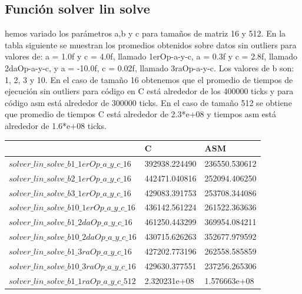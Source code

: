 \subsection{Función solver lin solve}
hemos variado los parámetros a,b y c para tamaños de matriz 16 y 512. En la tabla siguiente se muestran los promedios obtenidos sobre datos sin outliers para valores de: a = 1.0f y c = 4.0f, llamado 1erOp-a-y-c, a = 0.3f y c = 2.8f, llamado 2daOp-a-y-c, y a = -10.0f, c = 0.02f, llamado 3raOp-a-y-c. Los valores de b son: 1, 2, 3 y 10. En el caso de tamaño 16 obtenemos que el promedio de tiempos de ejecución sin outliers para código en C está alrededor de los 400000 ticks y para código asm está alrededor de 300000 ticks. En el caso de tamaño 512 se obtiene que promedio de tiempos C está alrededor de 2.3*e+08 y tiempos asm está alrededor de 1.6*e+08 ticks.
\begin{table}[htbp]
\begin{center}
\begin{tabular}{|l|l|l|}
\hline
  & C & ASM\\
\hline \hline
$solver\_lin\_solve\_b1\_1erOp\_a\_y\_c\_16$ & 392938.224490 & 236550.530612\\ \hline

$solver\_lin\_solve\_b2\_1erOp\_a\_y\_c\_16$ & 442471.040816 & 252094.406250\\ \hline

$solver\_lin\_solve\_b3\_1erOp\_a\_y\_c\_16$ & 429083.391753 & 253708.344086\\ \hline

$solver\_lin\_solve\_b10\_1erOp\_a\_y\_c\_16$ & 436142.561224  & 261522.363636\\ \hline


$solver\_lin\_solve\_b1\_2daOp\_a\_y\_c\_16$ & 461250.443299 & 369954.084211\\ \hline

$solver\_lin\_solve\_b10\_2daOp\_a\_y\_c\_16$ & 430715.626263 & 352677.979592\\ \hline

$solver\_lin\_solve\_b1\_3raOp\_a\_y\_c\_16$ & 427202.773196  & 262558.585859\\ \hline


$solver\_lin\_solve\_b10\_3raOp\_a\_y\_c\_16$ & 429630.377551    & 237256.265306\\ \hline

\hline \hline 


$solver\_lin\_solve\_b1\_1raOp\_a\_y\_c\_512$ & 2.320231e+08  & 1.576663e+08\\ \hline


\end{tabular}
\end{center}
\end{table}
